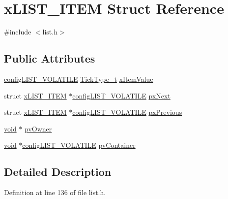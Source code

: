\hypertarget{structx_l_i_s_t___i_t_e_m}{}\section{x\+L\+I\+S\+T\+\_\+\+I\+T\+EM Struct Reference}
\label{structx_l_i_s_t___i_t_e_m}


{\ttfamily \#include $<$list.\+h$>$}

\subsection*{Public Attributes}
\begin{DoxyCompactItemize}
\item 
\hyperlink{list_8h_a2d5de557c5561c8980d1bf51d87d8cba}{config\+L\+I\+S\+T\+\_\+\+V\+O\+L\+A\+T\+I\+LE} \hyperlink{_g_c_c_2_a_r_m___c_m3_2portmacro_8h_aa69c48c6e902ce54f70886e6573c92a9}{Tick\+Type\+\_\+t} \hyperlink{structx_l_i_s_t___i_t_e_m_a943ec2a4a53818cbc380079cb33c8e59}{x\+Item\+Value}
\item 
struct \hyperlink{structx_l_i_s_t___i_t_e_m}{x\+L\+I\+S\+T\+\_\+\+I\+T\+EM} $\ast$\hyperlink{list_8h_a2d5de557c5561c8980d1bf51d87d8cba}{config\+L\+I\+S\+T\+\_\+\+V\+O\+L\+A\+T\+I\+LE} \hyperlink{structx_l_i_s_t___i_t_e_m_a03713c4ee953ef5ca6adbec883720c60}{px\+Next}
\item 
struct \hyperlink{structx_l_i_s_t___i_t_e_m}{x\+L\+I\+S\+T\+\_\+\+I\+T\+EM} $\ast$\hyperlink{list_8h_a2d5de557c5561c8980d1bf51d87d8cba}{config\+L\+I\+S\+T\+\_\+\+V\+O\+L\+A\+T\+I\+LE} \hyperlink{structx_l_i_s_t___i_t_e_m_ae8e553eae41010a8e41c66d76c94110b}{px\+Previous}
\item 
\hyperlink{usb__devapi_8h_afabf60e7f57651d6d595a02c75f07cd0}{void} $\ast$ \hyperlink{structx_l_i_s_t___i_t_e_m_aeb3110b50fe0dbce826d929b27b5ddb1}{pv\+Owner}
\item 
\hyperlink{usb__devapi_8h_afabf60e7f57651d6d595a02c75f07cd0}{void} $\ast$\hyperlink{list_8h_a2d5de557c5561c8980d1bf51d87d8cba}{config\+L\+I\+S\+T\+\_\+\+V\+O\+L\+A\+T\+I\+LE} \hyperlink{structx_l_i_s_t___i_t_e_m_a341462d06236aa07eaf1a864e4b59951}{pv\+Container}
\end{DoxyCompactItemize}


\subsection{Detailed Description}


Definition at line 136 of file list.\+h.



